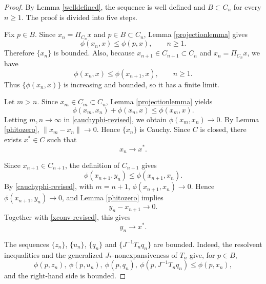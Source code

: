\documentclass[leqno,12pt]{amsart}
\theoremstyle{definition}
\numberwithin{equation}{section}
\begin{document}
\begin{proof}
By Lemma \ref{welldefined}, the sequence is well defined and $B\subset C_n$ for every $n\geq1$. The proof is divided into five steps.

Fix $p\in B$. Since $x_n=\Pi_{C_n}x$ and $p\in B\subset C_n$, Lemma \ref{projectionlemma} gives
\[
\phi(x_n,x)\leq \phi(p,x),\qquad n\geq1.
\]
Therefore $\{x_n\}$ is bounded. Also, because $x_{n+1}\in C_{n+1}\subset C_n$ and $x_n=\Pi_{C_n}x$, we have
\[
\phi(x_n,x)\leq \phi(x_{n+1},x),\qquad n\geq1.
\]
Thus $\{\phi(x_n,x)\}$ is increasing and bounded, so it has a finite limit.

Let $m>n$. Since $x_m\in C_m\subset C_n$, Lemma \ref{projectionlemma} yields
\begin{equation}\label{cauchyphi-revised}
\phi(x_m,x_n)+\phi(x_n,x)\leq \phi(x_m,x).
\end{equation}
Letting $m,n\to\infty$ in \eqref{cauchyphi-revised}, we obtain $\phi(x_m,x_n)\to0$. By Lemma \ref{phitozero}, $\|x_m-x_n\|\to0$. Hence $\{x_n\}$ is Cauchy. Since $C$ is closed, there exists $x^{*}\in C$ such that
\begin{equation}\label{xconv-revised}
x_n\to x^{*}.
\end{equation}

Since $x_{n+1}\in C_{n+1}$, the definition of $C_{n+1}$ gives
\[
\phi(x_{n+1},y_n)\leq \phi(x_{n+1},x_n).
\]
By \eqref{cauchyphi-revised}, with $m=n+1$, $\phi(x_{n+1},x_n)\to0$. Hence $\phi(x_{n+1},y_n)\to0$, and Lemma \ref{phitozero} implies
\begin{equation}\label{ynconv-revised}
y_n-x_{n+1}\to0.
\end{equation}
Together with \eqref{xconv-revised}, this gives
\begin{equation}\label{ynx-revised}
y_n\to x^{*}.
\end{equation}

The sequences $\{z_n\}$, $\{u_n\}$, $\{q_n\}$ and $\{J^{-1}T_nq_n\}$ are bounded. Indeed, the resolvent inequalities and the generalized $J_{*}$-nonexpansiveness of $T_n$ give, for $p\in B$,
\[
\phi(p,z_n),\ \phi(p,u_n),\ \phi(p,q_n),\ \phi(p,J^{-1}T_nq_n)\leq \phi(p,x_n),
\]
and the right-hand side is bounded.


\end{proof}
\end{document}
